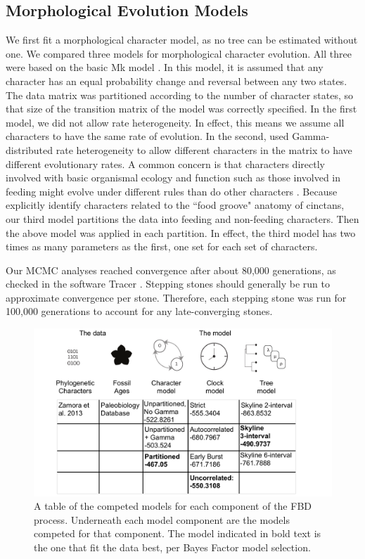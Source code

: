 \documentclass{article}
\begin{document}
\subsection{Morphological Evolution Models}
We first fit a morphological character model, as no tree can be estimated without one.
We compared three models for morphological character evolution. 
All three were based on the basic Mk model \citep{Lewis2001}. 
In this model, it is assumed that any character has an equal probability change and reversal between any two states. 
The data matrix was partitioned according to the number of character states, so that size of the transition matrix of the model was correctly specified.
In the first model, we did not allow rate heterogeneity. 
In effect, this means we assume all characters to have the same rate of evolution.
In the second, used Gamma-distributed rate heterogeneity to allow different characters in the matrix to have different evolutionary rates.
A common concern is that characters directly involved with basic organismal ecology and function such as those involved in feeding might evolve under different rules than do other characters \citep{Foote1994,Foote1996a,Wagner1995,Sanchez-Villagra1998,Ciampaglio2002,HopkinsSmith2015, Wright2017}. Because \citet{SmithZamora2009} explicitly identify characters related to the ``food groove" anatomy of cinctans, our third model partitions the data into feeding and non-feeding characters.
Then the above model was applied in each partition.
In effect, the third model has two times as many parameters as the first, one set for each set of characters.

Our MCMC analyses reached convergence after about 80,000 generations, as checked in the software Tracer \citep{Rambaut2018}. 
Stepping stones should generally be run to approximate convergence per stone.
Therefore, each stepping stone was run for 100,000 generations to account for any late-converging stones.

\begin{figure}
  \includegraphics[width=\textwidth]{figures/Fig2.pdf}

  \caption{A table of the competed models for each component of the FBD process. Underneath each model component are the models competed for that component. The model indicated in bold text is the one that fit the data best, per Bayes Factor model selection.}
\end{figure}
\end{document}
